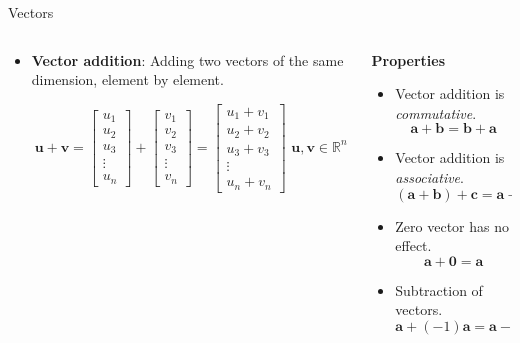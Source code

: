 \documentclass[aspectratio=169]{beamer}
\let\olditem\item
\renewcommand{\item}{\setlength{\itemsep}{\fill}\olditem}
\begin{document}
\begin{frame}[t]{Vectors}
\begin{columns}[T]
\begin{column}{0.5\textwidth}
\begin{itemize}
\item \textbf{Vector addition}: Adding two vectors of the same dimension, element by element.
\begin{small}
$$ \mathbf{u} + \mathbf{v} = \begin{bmatrix} u_1 \\ u_2 \\ u_3 \\ \vdots \\ u_n \end{bmatrix} + \begin{bmatrix} v_1 \\ v_2 \\ v_3 \\ \vdots \\ v_n \end{bmatrix}= \begin{bmatrix} u_1 + v_1 \\ u_2 + v_2 \\ u_3 + v_3 \\ \vdots \\ u_n + v_n \end{bmatrix} \,\, \mathbf{u}, \mathbf{v} \in \mathbb{R}^n$$
\end{small}
\end{itemize}
\begin{center}
\end{center}
\end{column}
\begin{column}{0.5\textwidth}
\textbf{Properties}
\begin{itemize}
\item Vector addition is \textit{commutative}.
$$ \mathbf{a} + \mathbf{b} = \mathbf{b} + \mathbf{a} $$
\item Vector addition is \textit{associative}.
$$ \left(\mathbf{a} + \mathbf{b}\right) + \mathbf{c} =  \mathbf{a} + \left(\mathbf{b} + \mathbf{c} \right) $$
\item Zero vector has no effect.
$$ \mathbf{a} + \mathbf{0} = \mathbf{a} $$
\item Subtraction of vectors. 
$$ \mathbf{a} + (-1)\mathbf{a} = \mathbf{a} - \mathbf{a} = \mathbf{0} $$
\end{itemize}
\end{column}
\end{columns}
\end{frame}
\end{document}
